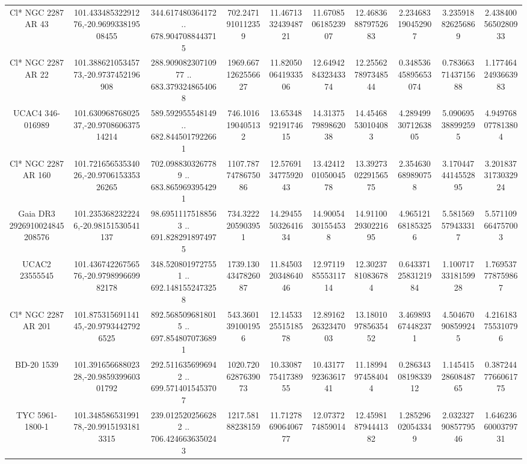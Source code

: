 \begin{table}
\begin{tabular}{cccccccccc}
Cl* NGC 2287     AR      43 & 101.43348532291276,-20.969933819508455 & 344.617480364172 .. 678.9047088443715 & 702.2471910112359 & 11.467133243948721 & 11.670850618523907 & 12.468368879752683 & 2.234683190452907 & 3.235918826256869 & 2.4384005650280933 \\
Cl* NGC 2287     AR      22 & 101.38862105345773,-20.9737452196908 & 288.90908230710977 .. 683.3793248654068 & 1969.6671262556627 & 11.820500641933506 & 12.649428432343374 & 12.255627897348544 & 0.34853645895653074 & 0.7836637143715688 & 1.1774642493663983 \\
UCAC4 346-016989 & 101.63096876802537,-20.970860637514214 & 589.592955548149 .. 682.8445017922661 & 746.1016190405132 & 13.653489219174615 & 14.313757989862038 & 14.45468530104083 & 4.2894993071263805 & 5.090695388992595 & 4.949768077813804 \\
Cl* NGC 2287     AR     160 & 101.72165653534026,-20.970615335326265 & 702.0988303267789 .. 683.8659693954291 & 1107.7877478675086 & 12.576913477592043 & 13.424120105004578 & 13.392730229156575 & 2.354630689890758 & 3.1704474414552895 & 3.2018373173032924 \\
Gaia DR3 2926910024845208576 & 101.2353682322246,-20.98151530541137 & 98.69511175188563 .. 691.8282918974975 & 734.3222205903951 & 14.294555032641634 & 14.90054301554538 & 14.911002930221695 & 4.965121681853256 & 5.581569579433317 & 5.571109664757003 \\
UCAC2  23555545 & 101.43674226756576,-20.979899669982178 & 348.5208019727551 .. 692.1481552473258 & 1739.1304347826087 & 11.845032034864046 & 12.971198555311714 & 12.30237810836784 & 0.6433712583121984 & 1.1007173318159928 & 1.769537778759867 \\
Cl* NGC 2287     AR     201 & 101.87531569114145,-20.97934427926525 & 892.5685096818015 .. 697.8548070736891 & 543.3601391001956 & 12.145332551518578 & 12.891622632347003 & 13.180109785635452 & 3.469893674482371 & 4.504670908599245 & 4.216183755310796 \\
BD-20  1539 & 101.39165668802328,-20.985939960301792 & 292.5116356996942 .. 699.5714015453707 & 1020.7206287639073 & 10.330877541738955 & 10.431779236361741 & 11.18994974584044 & 0.2863430819833912 & 1.1454152860848765 & 0.3872447766061775 \\
TYC 5961-1800-1 & 101.34858653199178,-20.99151931813315 & 239.0125202566282 .. 706.4246636350243 & 1217.58188238159 & 11.712786906406777 & 12.0737274859014 & 12.459818794441382 & 1.285296020543349 & 2.0323279085779546 & 1.6462366000379731 \\

\end{tabular}
\end{table}
